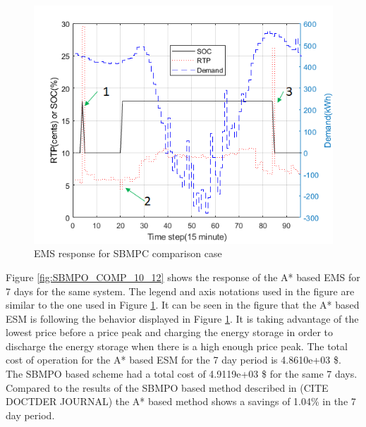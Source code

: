   \begin{figure}[!ht]
    \centering
    \includegraphics[width = \linewidth]{figs/SBMPO_COMP_1_day.png}
    \caption{EMS response for SBMPC comparison case}
    \label{fig:SBMPO_COMP_1_day}
\end{figure}

 Figure \ref{fig:SBMPO_COMP_10_12} shows the response of the A* based EMS for 7 days for the same system. The legend and axis notations used in the figure are similar to the one used in Figure \ref{fig:SBMPO_COMP_1_day}. It can be seen in the figure that the A* based ESM is following the behavior displayed in Figure \ref{fig:SBMPO_COMP_1_day}. It is taking advantage of the lowest price before a price peak and charging the energy storage in order to discharge the energy storage when there is a high enough price peak. The total cost of operation for the A* based ESM for the 7 day period is 4.8610e+03 \$. The SBMPO based scheme had a total cost of 4.9119e+03 \$ for the same 7 days. Compared to the results of the SBMPO based method described in \colorbox{BurntOrange}{(CITE DOCTDER JOURNAL)} the A* based method shows a savings of 1.04\% in the 7 day period.
 
